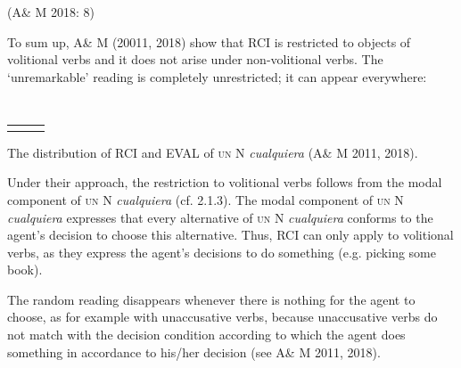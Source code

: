(A\& M 2018: 8)

To sum up, A\& M (20011, 2018) show that RCI is restricted to objects of volitional verbs and it does not arise under non-volitional verbs. The ‘unremarkable’ reading is completely unrestricted; it can appear everywhere:

\begin{table}
\tabletail{}
\tablelasttail{}
\begin{tabularx}{\textwidth}{XXX}
\lspbottomrule
\end{tabularx}
\lsptoprule
\caption{\label{tab:} ~}The distribution of RCI and EVAL of \textsc{un} N \textit{cualquiera} (A\& M 2011, 2018).
\end{table}

Under their approach, the restriction to volitional verbs follows from the modal component of \textsc{un} N \textit{cualquiera} (cf. 2.1.3). The modal component of \textsc{un} N \textit{cualquiera} expresses that every alternative of \textsc{un} N \textit{cualquiera} conforms to the agent’s decision to choose this alternative. Thus, RCI can only apply to volitional verbs, as they express the agent’s decisions to do something (e.g. picking some book).

  The random reading disappears whenever there is nothing for the agent to choose, as for example with unaccusative verbs, because unaccusative verbs do not match with the decision condition according to which the agent does something in accordance to his/her decision (see A\& M 2011, 2018).

